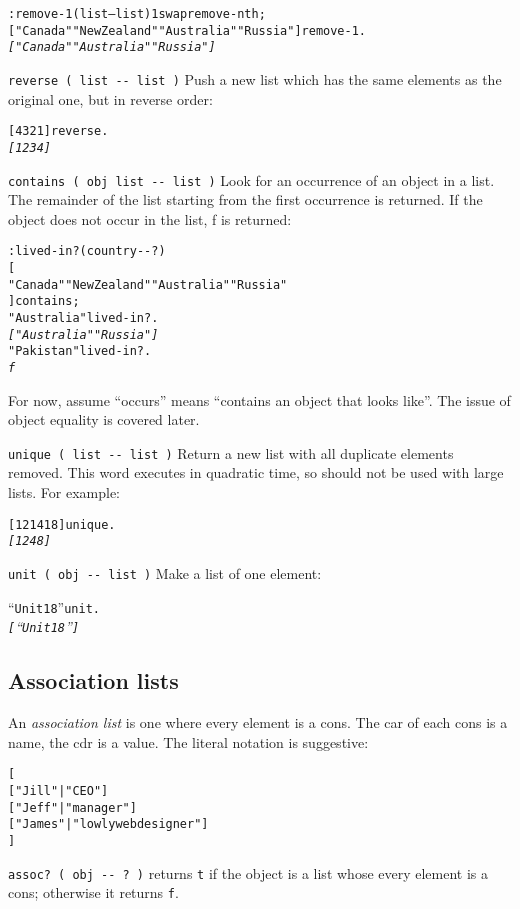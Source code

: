 \documentclass[english]{article}
\begin{document}
\begin{alltt}
: remove-1 ( list -- list ) 1 swap remove-nth ;
{[} "Canada" "New Zealand" "Australia" "Russia" {]} remove-1 .
\emph{{[} "Canada" "Australia" "Russia" {]}}
\end{alltt}
\texttt{reverse ( list -{}- list )} Push a new list which has the
same elements as the original one, but in reverse order:

\begin{alltt}
{[} 4 3 2 1 {]} reverse .
\emph{{[} 1 2 3 4 {]}}
\end{alltt}
\texttt{contains ( obj list -{}- list )} Look for an occurrence of
an object in a list. The remainder of the list starting from the first
occurrence is returned. If the object does not occur in the list,
f is returned:

\begin{alltt}
: lived-in? ( country -{}- ? )
    {[}
        "Canada" "New Zealand" "Australia" "Russia"
    {]} contains ;
"Australia" lived-in? .
\emph{{[} "Australia" "Russia" {]}}
"Pakistan" lived-in? .
\emph{f}
\end{alltt}
For now, assume {}``occurs'' means {}``contains an object that
looks like''. The issue of object equality is covered later.

\texttt{unique ( list -{}- list )} Return a new list with all duplicate
elements removed. This word executes in quadratic time, so should
not be used with large lists. For example:

\begin{alltt}
{[} 1 2 1 4 1 8 {]} unique .
\emph{{[} 1 2 4 8 {]}}
\end{alltt}
\texttt{unit ( obj -{}- list )} Make a list of one element:

\begin{alltt}
{}``Unit 18'' unit .
\emph{{[} {}``Unit 18'' {]}}
\end{alltt}

\subsection{Association lists}

An \emph{association list} is one where every element is a cons. The
car of each cons is a name, the cdr is a value. The literal notation
is suggestive:

\begin{alltt}
{[}
    {[} "Jill"  | "CEO" {]}
    {[} "Jeff"  | "manager" {]}
    {[} "James" | "lowly web designer" {]}
{]}
\end{alltt}
\texttt{assoc? ( obj -{}- ? )} returns \texttt{t} if the object is
a list whose every element is a cons; otherwise it returns \texttt{f}.
\end{document}
